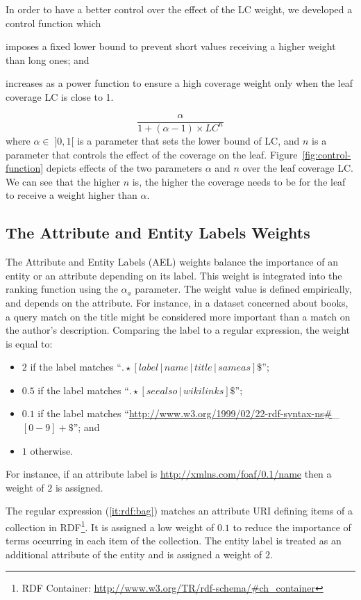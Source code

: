 In order to have a better control over the effect of the LC weight, we developed a control function which
\begin{inparaenum}[(1)]
	\item imposes a fixed lower bound to prevent short values receiving a higher weight than long ones; and
	\item increases as a power function to ensure a high coverage weight only when the leaf coverage LC is close to 1.
\end{inparaenum}
\begin{equation}
\label{eq:lc-norm}
\frac{\alpha}{1+(\alpha-1)\times LC^n}
\end{equation}
where $\alpha \in \; ]0,1[$ is a parameter that sets the lower bound of LC, and $n$ is a parameter that controls the effect of the coverage on the leaf. Figure~\ref{fig:control-function} depicts effects of the two parameters $\alpha$ and $n$ over the leaf coverage LC. We can see that the higher $n$ is, the higher the coverage needs to be for the leaf to receive a weight higher than $\alpha$.

\subsection{The Attribute and Entity Labels Weights}
\label{sec:att-subj-w}

The Attribute and Entity Labels (AEL) weights balance the importance of an entity or an attribute depending on its label. This weight is integrated into the ranking function using the $\alpha_a$ parameter.
The weight value is defined empirically, and depends on the attribute. For instance, in a dataset concerned about books, a query match on the title might be considered more important than a match on the author's description.
Comparing the label to a regular expression, the weight is equal to:

\begin{itemize}
    \item $2$ if the label matches ``$.\star[label\,\vert\,name\,\vert\,title\,\vert\,sameas]\$$'';
    \item $0.5$ if the label matches ``$.\star[seealso\,\vert\,wikilinks]\$$'';
    \item $0.1$ if the label matches ``\url{http://www.w3.org/1999/02/22-rdf-syntax-ns\#}\_$[0-9]+\$$''; and
    \label{it:rdf:bag}
    \item $1$ otherwise.
\end{itemize}
For instance, if an attribute label is \url{http://xmlns.com/foaf/0.1/name} then a weight of $2$ is assigned.

The regular expression (\ref{it:rdf:bag}) matches an attribute URI defining items of a collection in RDF\footnote{RDF Container: \url{http://www.w3.org/TR/rdf-schema/\#ch\_container}}. It is assigned a low weight of $0.1$ to reduce the importance of terms occurring in each item of the collection. The entity label is treated as an additional attribute of the entity and is assigned a weight of $2$.
